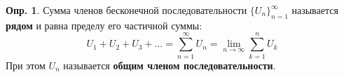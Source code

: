 \documentclass[11pt,a4paper]{article}
\date{}
\theoremstyle{definition}
\newtheorem{definition}{Опр.}[section]
\begin{document}
\begin{definition}
Сумма членов бесконечной последовательности $\{U_n\}_{n=1}^{\infty}$ называется \textbf{рядом} и равна пределу его частичной суммы:
    \begin{equation}
        U_1 + U_2 + U_3 + \dots = \sum_{n=1}^{\infty} U_n = \lim_{n \to \infty} \sum_{k=1}^{n} U_k
    \end{equation}
При этом $U_n$ называется \textbf{общим членом последовательности}.
\end{definition}
\end{document}

